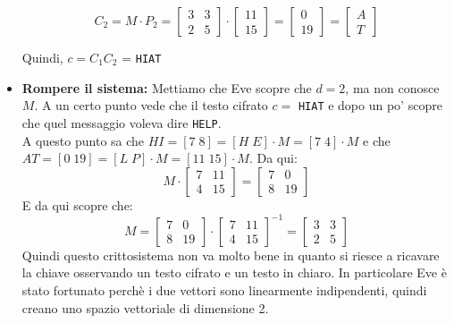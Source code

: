 \begin{itemize}
	\[
	C_2= M \cdot P_2 = \begin{bmatrix}
	3 & 3\\
	2 & 5
	\end{bmatrix} 
	\cdot \begin{bmatrix}
	11 \\
	15
	\end{bmatrix}
	=
	\begin{bmatrix}
	0\\
	19
	\end{bmatrix}
	=
	\begin{bmatrix}
	A\\
	T
	\end{bmatrix}
	\]
	
	Quindi, $c=C_1C_2$ = \texttt{HIAT}
	
	\item \textbf{Rompere il sistema:} Mettiamo che Eve scopre che $d=2$, ma non conosce $M$.
	A un certo punto vede che il testo cifrato $c=$ \texttt{HIAT} e dopo un po' scopre che quel messaggio voleva dire \texttt{HELP}.\\
	A questo punto sa che $HI = [7\; 8] = [H\; E] \cdot M = [7 \; 4] \cdot M$ e che\\
	$AT = [0\; 19] = [L\; P] \cdot M = [11 \; 15] \cdot M$. Da qui:
	\[
	M \cdot \begin{bmatrix}
	7 & 11\\
	4 & 15
	\end{bmatrix} 
	= \begin{bmatrix}
	7 & 0\\
	8 & 19
	\end{bmatrix}
	\]
	E da qui scopre che:
	\[
	M = \begin{bmatrix}
	7 & 0\\
	8 & 19
	\end{bmatrix} 
	\cdot \begin{bmatrix}
	7 & 11\\
	4 & 15
	\end{bmatrix}^{-1}
	= 
	\begin{bmatrix}
	3 & 3\\
	2 & 5
	\end{bmatrix}
	\]
	Quindi questo crittosistema non va molto bene in quanto si riesce a ricavare la chiave osservando un testo cifrato e un testo in chiaro. In particolare Eve è stato fortunato perchè i due vettori sono linearmente indipendenti, quindi creano uno spazio vettoriale di dimensione 2.
	

	
\end{itemize}

